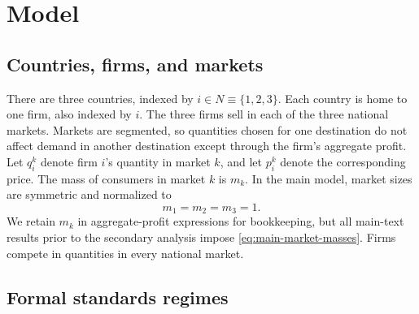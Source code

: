\section{Model}
\label{sec:model}

\subsection{Countries, firms, and markets}
\label{subsec:model-countries}

There are three countries, indexed by $i\in N\equiv\{1,2,3\}$. Each country is home to one firm, also indexed by $i$. The three firms sell in each of the three national markets. Markets are segmented, so quantities chosen for one destination do not affect demand in another destination except through the firm's aggregate profit. Let $q_i^k$ denote firm $i$'s quantity in market $k$, and let $p_i^k$ denote the corresponding price. The mass of consumers in market $k$ is $m_k$. In the main model, market sizes are symmetric and normalized to
\begin{equation}
    m_1=m_2=m_3=1.
    \label{eq:main-market-masses}
\end{equation}
We retain $m_k$ in aggregate-profit expressions for bookkeeping, but all main-text results prior to the secondary analysis impose \eqref{eq:main-market-masses}. Firms compete in quantities in every national market.

\subsection{Formal standards regimes}
\label{subsec:model-formal-standards}


